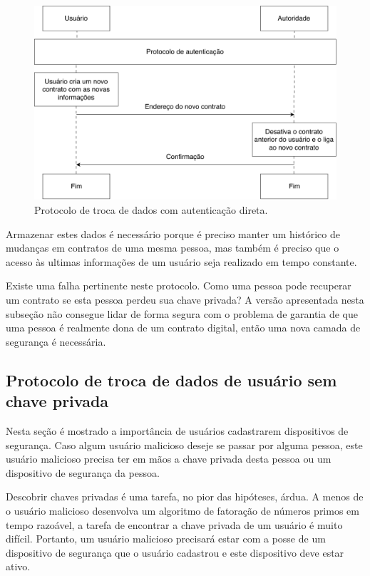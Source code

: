 \documentclass[tcc,capa]{texufpel}
\begin{document}
        \begin{figure}
            \centering
            \includegraphics[width=15cm]{imagens/protocolo-troca-com-chave.pdf}
            \caption{Protocolo de troca de dados com autenticação direta.}
            \label{fig:protocolo-troca-com-chave}
        \end{figure}
        
        Armazenar estes dados é necessário porque é preciso manter um histórico de mudanças em contratos de uma mesma pessoa, mas também é preciso que o acesso às ultimas informações de um usuário seja realizado em tempo constante.
        
        Existe uma falha pertinente neste protocolo. Como uma pessoa pode recuperar um contrato se esta pessoa perdeu sua chave privada? A versão apresentada nesta subseção não consegue lidar de forma segura com o problema de garantia de que uma pessoa é realmente dona de um contrato digital, então uma nova camada de segurança é necessária.
        
    \subsection{Protocolo de troca de dados de usuário sem chave privada}
    
        Nesta seção é mostrado a importância de usuários cadastrarem dispositivos de segurança. Caso algum usuário malicioso deseje se passar por alguma pessoa, este usuário malicioso precisa ter em mãos a chave privada desta pessoa ou um dispositivo de segurança da pessoa.
        
        Descobrir chaves privadas é uma tarefa, no pior das hipóteses, árdua. A menos de o usuário malicioso desenvolva um algoritmo de fatoração de números primos em tempo razoável, a tarefa de encontrar a chave privada de um usuário é muito difícil. Portanto, um usuário malicioso precisará estar com a posse de um dispositivo de segurança que o usuário cadastrou e este dispositivo deve estar ativo.
        
\end{document}
